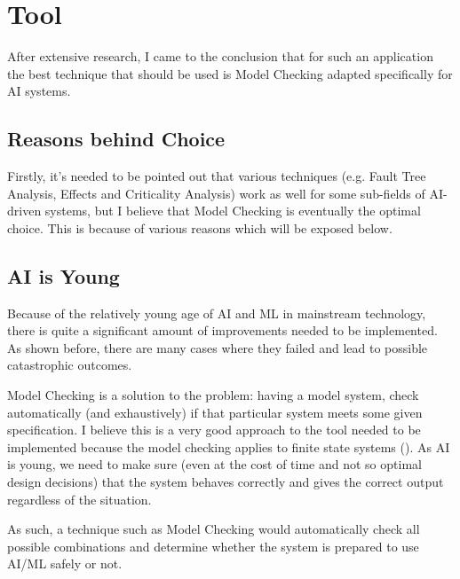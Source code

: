 \documentclass[paper=a4, fontsize=11pt]{scrartcl} %
\numberwithin{equation}{section} %
\numberwithin{figure}{section} %
\numberwithin{table}{section} %
\begin{document}
\section{Tool}

\par
After extensive research, I came to the conclusion that for such an application the best technique that should be used is Model Checking adapted specifically for AI systems. \\


\subsection{Reasons behind Choice}

\par
Firstly, it's needed to be pointed out that various techniques (e.g. Fault Tree Analysis, Effects and Criticality Analysis) work as well for some sub-fields of AI-driven systems, but I believe that Model Checking is eventually the optimal choice. This is because of various reasons which will be exposed below.


\subsection{AI is Young}

\par
Because of the relatively young age of AI and ML in mainstream technology, there is quite a significant amount of improvements needed to be implemented. As shown before, there are many cases where they failed and lead to possible catastrophic outcomes. \\

\par
Model Checking is a solution to the problem: having a model system, check automatically (and exhaustively) if that particular system meets some given specification. I believe this is a very good approach to the tool needed to be implemented because the model checking applies to finite state systems (\cite{wiley-encyclopedia}). As AI is young, we need to make sure (even at the cost of time and not so optimal design decisions) that the system behaves correctly and gives the correct output regardless of the situation.

\par
As such, a technique such as Model Checking would automatically check all possible combinations and determine whether the system is prepared to use AI/ML safely or not.
\end{document}
